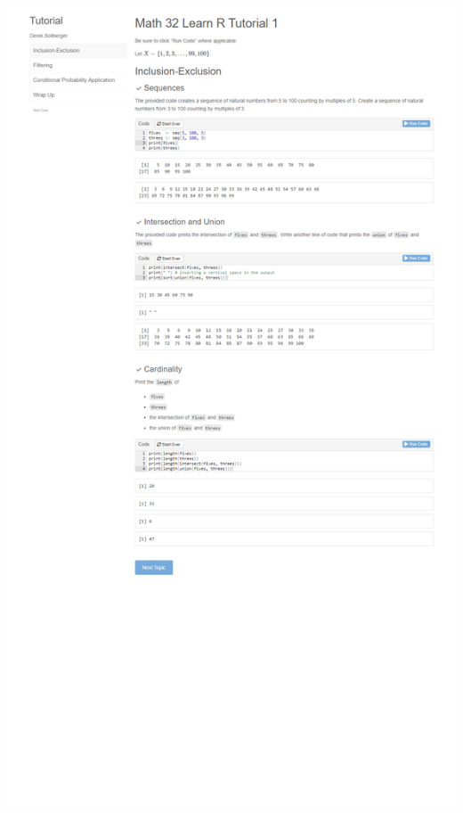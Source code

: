 \documentclass[a4paper]{article}
\begin{document}
\includegraphics[scale=0.4]{page_1.png} \\
\end{document}
